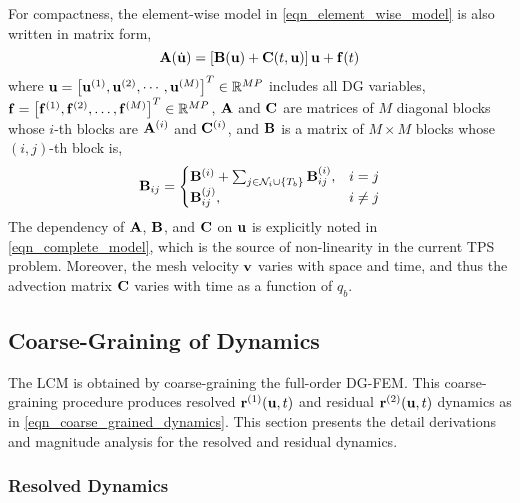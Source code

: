 For compactness, the element-wise model in \cref{eqn_element_wise_model} is also written in matrix form,
\begin{equation}
    \mathbf{A}(\dot{\mathbf{u}}) = \left[\mathbf{B}(\mathbf{u}) + \mathbf{C}(t,\mathbf{u})\right]\mathbf{u} + \mathbf{f}(t)\label{eqn_complete_model}
\end{equation}
where $\mathbf{u} = \left[\mathbf{u}^{(1)},\mathbf{u}^{(2)},\cdots,\mathbf{u}^{(M)}\right]^T\in\mathbb{R}^{MP}$ includes all DG variables, $\mathbf{f}=\left[\mathbf{f}^{(1)},\mathbf{f}^{(2)},\dots,\mathbf{f}^{(M)}\right]^T\in\mathbb{R}^{MP}$, $\mathbf{A}$ and $\mathbf{C}$ are matrices of $M$ diagonal blocks whose $i$-th blocks are $\mathbf{A}^{(i)}$ and $\mathbf{C}^{(i)}$, and $\mathbf{B}$ is a matrix of $M\times M$ blocks whose $(i,j)$-th block is,
\begin{equation}
    \mathbf{B}_{ij} = \begin{cases}
            \mathbf{B}^{(i)} + \sum_{j\in\mathcal{N}_i\cup\left\{T_b\right\}}\mathbf{B}^{(i)}_{ij}, & i=j\\
            \mathbf{B}^{(j)}_{ij}, & i\neq j
        \end{cases}
\end{equation}
The dependency of $\mathbf{A}$, $\mathbf{B}$, and $\mathbf{C}$ on $\mathbf{u}$ is explicitly noted in \cref{eqn_complete_model}, which is the source of non-linearity in the current TPS problem. Moreover, the mesh velocity $\mathbf{v}$ varies with space and time, and thus the advection matrix $\mathbf{C}$ varies with time as a function of $q_b$.

\subsection{Coarse-Graining of Dynamics}

The LCM is obtained by coarse-graining the full-order DG-FEM. This coarse-graining procedure produces resolved $\mathbf{r}^{(1)}(\mathbf{u},t)$ and residual $\mathbf{r}^{(2)}(\mathbf{u},t)$ dynamics as in \cref{eqn_coarse_grained_dynamics}. This section presents the detail derivations and magnitude analysis for the resolved and residual dynamics.

\subsubsection{Resolved Dynamics}


